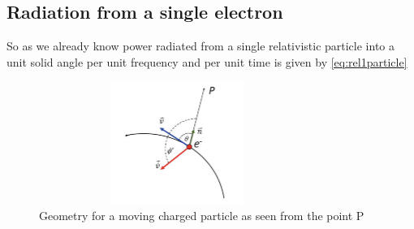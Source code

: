 \documentclass[11pt]{report}
\begin{document}
\subsection{Radiation from a single electron}
So as we already know power radiated from a single relativistic particle into a unit solid angle per unit frequency and per unit time is given by \eqref{eq:rel1particle}
\begin{figure}[h!]
\includegraphics[height=4cm,width=9cm]{singleprad.png}
\caption{Geometry for a moving charged particle as seen from the point P}
\end{figure}
\end{document}
